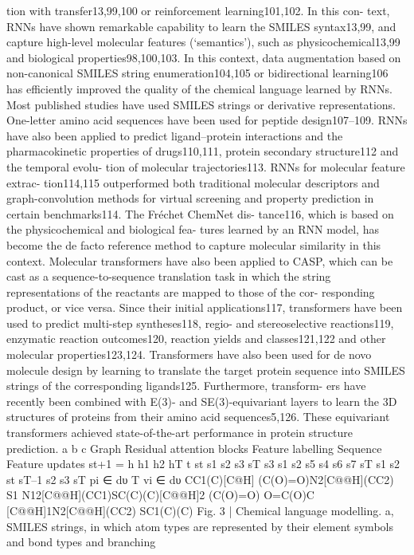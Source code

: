 tion with transfer13,99,100 or reinforcement learning101,102. In this con-
text, RNNs have shown remarkable capability to learn the SMILES
syntax13,99, and capture high-level molecular features (‘semantics’),
such as physicochemical13,99 and biological properties98,100,103. In
this context, data augmentation based on non-canonical SMILES
string enumeration104,105 or bidirectional learning106 has efficiently
improved the quality of the chemical language learned by RNNs.
Most published studies have used SMILES strings or derivative
representations. One-letter amino acid sequences have been used
for peptide design107–109. RNNs have also been applied to predict
ligand–protein interactions and the pharmacokinetic properties of
drugs110,111, protein secondary structure112 and the temporal evolu-
tion of molecular trajectories113. RNNs for molecular feature extrac-
tion114,115 outperformed both traditional molecular descriptors and
graph-convolution methods for virtual screening and property
prediction in certain benchmarks114. The Fréchet ChemNet dis-
tance116, which is based on the physicochemical and biological fea-
tures learned by an RNN model, has become the de facto reference
method to capture molecular similarity in this context.
Molecular transformers have also been applied to CASP, which
can be cast as a sequence-to-sequence translation task in which the
string representations of the reactants are mapped to those of the cor-
responding product, or vice versa. Since their initial applications117,
transformers have been used to predict multi-step syntheses118, regio-
and stereoselective reactions119, enzymatic reaction outcomes120,
reaction yields and classes121,122 and other molecular properties123,124.
Transformers have also been used for de novo molecule design
by learning to translate the target protein sequence into SMILES
strings of the corresponding ligands125. Furthermore, transform-
ers have recently been combined with E(3)- and SE(3)-equivariant
layers to learn the 3D structures of proteins from their amino
acid sequences5,126. These equivariant transformers achieved
state-of-the-art performance in protein structure prediction.
a
b
c
Graph
Residual attention blocks
Feature labelling
Sequence
Feature updates
st+1
=
h
h1
h2
hT
t
st
s1
s2
s3
sT
s3
s1
s2
s5
s4
s6
s7
sT
s1
s2
st
sT–1
s2
s3
sT
pi  ∈    dυ
T
vi  ∈    dυ
CC1(C)[C@H] (C(O)=O)N2[C@@H](CC2) S1
N12[C@@H](CC1)SC(C)(C)[C@@H]2 (C(O)=O)
O=C(O)C [C@@H]1N2[C@@H](CC2) SC1(C)(C)
Fig. 3 | Chemical language modelling. a, SMILES strings, in which atom types are represented by their element symbols and bond types and branching
